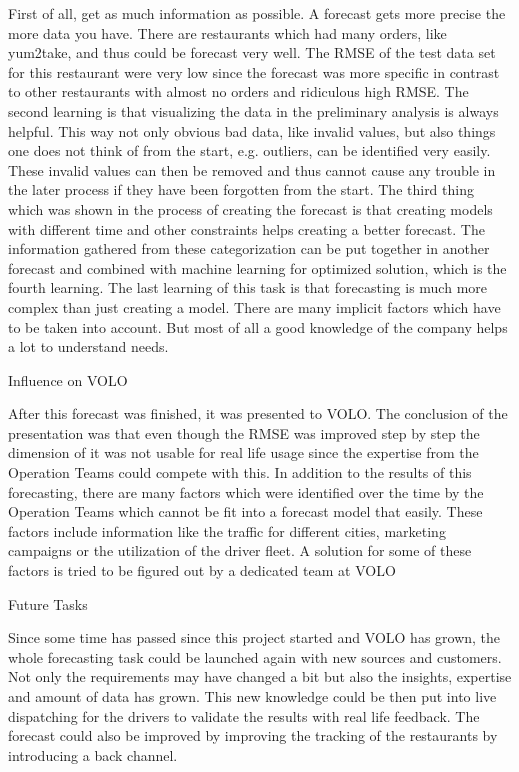 First of all, get as much information as possible. A forecast gets more precise the more data you have. There are restaurants which had many orders, like yum2take, and thus could be forecast very well. The RMSE of the test data set for this restaurant were very low since the forecast was more specific in contrast to other restaurants with almost no orders and ridiculous high RMSE.\newline
The second learning is that visualizing the data in the preliminary analysis is always helpful. This way not only obvious bad data, like invalid values, but also things one does not think of from the start, e.g. outliers, can be identified very easily. These invalid values can then be removed and thus cannot cause any trouble in the later process if they have been forgotten from the start.\newline
The third thing which was shown in the process of creating the forecast is that creating models with different time and other constraints helps creating a better forecast. The information gathered from these categorization can be put together in another forecast and combined with machine learning for optimized solution, which is the fourth learning.\newline
The last learning of this task is that forecasting is much more complex than just creating a model. There are many implicit factors which have to be taken into account. But most of all a good knowledge of the company helps a lot to understand needs.
\caption{Influence on VOLO}
After this forecast was finished, it was presented to VOLO. The conclusion of the presentation was that even though the RMSE was improved step by step the dimension of it was not usable for real life usage since the expertise from the Operation Teams could compete with this.\newline
In addition to the results of this forecasting, there are many factors which were identified over the time by the Operation Teams which cannot be fit into a forecast model that easily. These factors include information like the traffic for different cities, marketing campaigns or the utilization of the driver fleet. A solution for some of these factors is tried to be figured out by a dedicated team at VOLO
\caption{Future Tasks}
Since some time has passed since this project started and VOLO has grown, the whole forecasting task could be launched again with new sources and customers. Not only the requirements may have changed a bit but also the insights, expertise and amount of data has grown. This new knowledge could be then put into live dispatching for the drivers to validate the results with real life feedback.\newline
The forecast could also be improved by improving the tracking of the restaurants by introducing a back channel.
